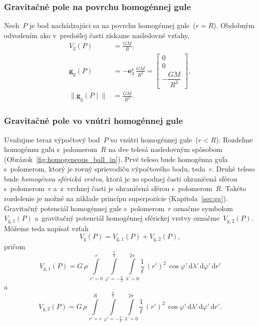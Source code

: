 \documentclass[a4paper, 12pt]{book}
\newcommand{\diff}{\mathrm d}
\newcommand{\gidx}{\mathrm g}
\let\vec\mathbf
\begin{document}
\subsubsection{Gravitačné pole na povrchu homogénnej gule}

Nech~$P$ je bod nachádzajúci sa na povrchu homogénnej gule~($r = R$).  Obdobným 
odvodením ako v~predošlej časti získame nasledovné vzťahy,
%
\begin{align}
\label{eq:vg_ball_on}
V_\gidx(P) &= \frac{GM}{R}{,}\\
%
\label{eq:gg_ball_on}
\vec g_\gidx(P) &= -\vec e_3^\mathrm{s} \, \frac{GM}{R^2} =
%
\begin{bmatrix}
0\\
0\\
-\dfrac{GM}{R^2}
\end{bmatrix}
{,}\\
%
\label{eq:gg_ball_on_magnitude}
\| \vec g_\gidx(P) \| &= \frac{GM}{R^2}{.}
\end{align}

\subsubsection{Gravitačné pole vo vnútri homogénnej gule}

Uvažujme teraz výpočtový bod~$P$ vo vnútri homogénnej gule~($r < R$).  Rozdeľme 
homogénnu guľu s~polomerom~$R$ na dve telesá nasledovným spôsobom 
(Obrázok~\ref{fig:homogeneous_ball_in}).  Prvé teleso bude homogénna guľa 
s~polomerom, ktorý je rovný sprievodiču výpočtového bodu, teda~$r$.  Druhé 
teleso bude \emph{homogénna sférická vrstva}, ktorá je zo spodnej časti 
ohraničená sférou s~polomerom~$r$ a~z~vrchnej časti je ohraničená sférou 
s~polomerom~$R$.  Takéto rozdelenie je možné na základe princípu superpozície 
(Kapitola~\ref{sec:gg}).  Gravitačný potenciál homogénnej gule s~polomerom~$r$ 
označme symbolom~$V_{\gidx,1}(P)$ a~gravitačný potenciál homogénnej sférickej 
vrstvy označme~$V_{\gidx,2}(P)$.  Môžeme teda napísať vzťah
%
\begin{equation}
\label{eq:vg_ball_in_split}
V_\gidx(P) = V_{\gidx,1}(P) + V_{\gidx,2}(P){,}
\end{equation}
%
pričom
%
\begin{equation}
V_{\gidx,1}(P) = G \, \rho \, \int\limits_{r' = 0}^{r} \int\limits_{\varphi' 
= -\frac{\pi}{2}}^{\frac{\pi}{2}} \int\limits_{\lambda' = 0}^{2\pi} 
\frac{1}{\ell} \, (r')^2 \, \cos\varphi' \, \diff \lambda' \, \diff \varphi' \, 
\diff r'
\end{equation}
%
a
%
\begin{equation}
\label{eq:vg_ball_in_2}
V_{\gidx,2}(P) = G \, \rho \, \int\limits_{r' = r}^{R} \int\limits_{\varphi' 
= -\frac{\pi}{2}}^{\frac{\pi}{2}} \int\limits_{\lambda' = 0}^{2\pi} 
\frac{1}{\ell} \, (r')^2 \, \cos\varphi' \, \diff \lambda' \, \diff \varphi' \, 
\diff r'{.}
\end{equation}
\end{document}
